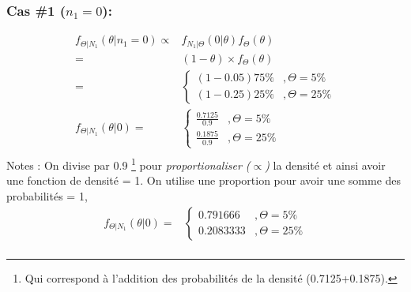 \documentclass[11pt,french]{report}
\begin{document}
\subsubsection*{Cas \#1 ($n_1 = 0$): }
\begin{align*}
f_{\Theta|N_1}(\theta| n_1 = 0) \propto & f_{N_1|\Theta}(0|\theta) f_{\Theta}(\theta) \\
= & (1 - \theta) \times  f_{\Theta}(\theta) \\
= & \left\{
     \begin{array}{rl}
      (1 - 0.05) 75\% &, \Theta = 5\% \\
      (1 - 0.25) 25\% &, \Theta = 25\%
     \end{array}
     \right. \\
f_{\Theta|N_1}(\theta|0) = & \left\{
     \begin{array}{rl}
      \frac{0.7125}{0.9} &, \Theta = 5\% \\
      \frac{0.1875}{0.9} &, \Theta = 25\%
     \end{array}
     \right. \\
\end{align*}
Notes : On divise par 0.9 \footnote{Qui correspond à l'addition des probabilités de la densité (0.7125+0.1875).} pour \emph{proportionaliser ($\propto$)} la densité et ainsi avoir une fonction de densité = 1.
On utilise une proportion pour avoir une somme des probabilités = 1,
\begin{align*}
f_{\Theta|N_1}(\theta|0) = & \left\{
     \begin{array}{rl}
      0.791666 &, \Theta = 5\% \\
      0.2083333 &, \Theta = 25\%
     \end{array}
     \right. \\
\end{align*}
\end{document}
